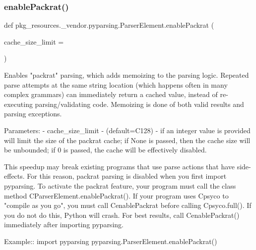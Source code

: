 \subsubsection{\texorpdfstring{enable\+Packrat()}{enablePackrat()}}
{\footnotesize\ttfamily def pkg\+\_\+resources.\+\_\+vendor.\+pyparsing.\+Parser\+Element.\+enable\+Packrat (\begin{DoxyParamCaption}\item[{}]{cache\+\_\+size\+\_\+limit = {} }\end{DoxyParamCaption})\hspace{0.3cm}{\ttfamily [static]}}

\begin{DoxyVerb}Enables "packrat" parsing, which adds memoizing to the parsing logic.
   Repeated parse attempts at the same string location (which happens
   often in many complex grammars) can immediately return a cached value,
   instead of re-executing parsing/validating code.  Memoizing is done of
   both valid results and parsing exceptions.
   
   Parameters:
    - cache_size_limit - (default=C{128}) - if an integer value is provided
      will limit the size of the packrat cache; if None is passed, then
      the cache size will be unbounded; if 0 is passed, the cache will
      be effectively disabled.
    
   This speedup may break existing programs that use parse actions that
   have side-effects.  For this reason, packrat parsing is disabled when
   you first import pyparsing.  To activate the packrat feature, your
   program must call the class method C{ParserElement.enablePackrat()}.  If
   your program uses C{psyco} to "compile as you go", you must call
   C{enablePackrat} before calling C{psyco.full()}.  If you do not do this,
   Python will crash.  For best results, call C{enablePackrat()} immediately
   after importing pyparsing.
   
   Example::
       import pyparsing
       pyparsing.ParserElement.enablePackrat()
\end{DoxyVerb}
 \mbox{\label{classpkg__resources_1_1__vendor_1_1pyparsing_1_1ParserElement_ac2708a9557b2c3724ceb052e45ef8903}} 
